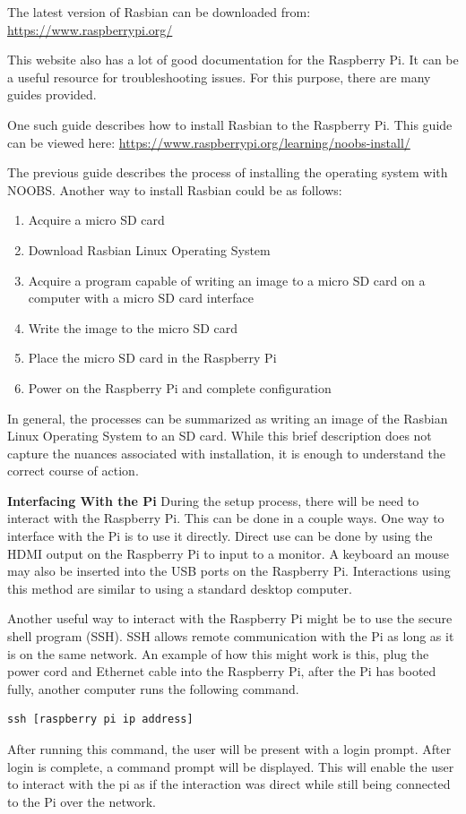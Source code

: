 \documentclass{article}	%
\begin{document}
\begin{multicols}{2}
The latest version of Rasbian can be downloaded from:
\url{https://www.raspberrypi.org/}

This website also has a lot of good documentation for
the Raspberry Pi.
It can be a useful resource for troubleshooting issues.
For this purpose,
there are many guides provided.

One such guide describes how to install Rasbian to the Raspberry Pi.
This guide can be viewed here:
\url{https://www.raspberrypi.org/learning/noobs-install/}

The previous guide describes the process
of installing the operating system with NOOBS.
Another way to install Rasbian could be as follows:
\begin{enumerate}
\item Acquire a micro SD card 
\item Download Rasbian Linux Operating System
\item Acquire a program capable of writing an image
    to a micro SD card on a computer with a micro SD card interface
\item Write the image to the micro SD card
\item Place the micro SD card in the Raspberry Pi
\item Power on the Raspberry Pi and complete configuration
\end{enumerate}

In general,
the processes can be summarized as 
writing an image of the Rasbian Linux Operating System to
an SD card.
While this brief description does not capture the nuances
associated with installation,
it is enough to understand the correct
course of action.

\textbf{Interfacing With the Pi}
During the setup process,
there will be need to interact with the Raspberry Pi.
This can be done in a couple ways.
One way to interface with the Pi is to use
it directly.
Direct use can be done by using the HDMI output
on the Raspberry Pi to input to a monitor.
A keyboard an mouse may also be inserted into
the USB ports on the Raspberry Pi.
Interactions using this method are similar to 
using a standard desktop computer.

Another useful way to interact with the Raspberry Pi
might be to use the secure shell program (SSH).
SSH allows remote communication with the Pi as
long as it is on the same network.
An example of how this might work is this,
plug the power cord and Ethernet cable into
the Raspberry Pi,
after the Pi has booted fully,
another computer runs the following command.
\begin{lstlisting}
ssh [raspberry pi ip address]
\end{lstlisting}
After running this command,
the user will be present with a login prompt.
After login is complete,
a command prompt will be displayed.
This will enable the user to interact with the pi
as if the interaction was direct while still
being connected to the Pi over the network.


\end{multicols}
\end{document}
